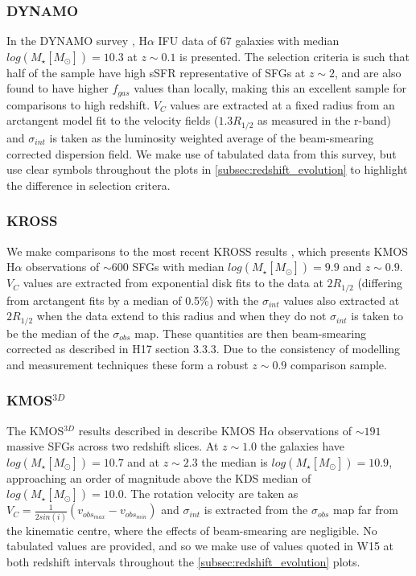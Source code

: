 \documentclass[fleqn,usenatbib]{mn2e}
\begin{document}
\subsubsection{DYNAMO}\label{subsubsec:DYNAMO}
In the DYNAMO survey \citep[G14]{Green2014}, H$\alpha$ IFU data of 67 galaxies with median $log(M_{\star}[M_{\odot}])=10.3$ at $z\sim0.1$ is presented.
The selection criteria is such that half of the sample have high sSFR representative of SFGs at $z\sim 2$, and are also found to have higher $f_{gas}$ values than locally, making this an excellent sample for comparisons to high redshift.
$V_{C}$ values are extracted at a fixed radius from an arctangent model fit to the velocity fields ($1.3R_{1/2}$ as measured in the r-band) and $\sigma_{int}$ is taken as the luminosity weighted average of the beam-smearing corrected dispersion field.
We make use of tabulated data from this survey, but use clear symbols throughout the plots in \cref{subsec:redshift_evolution} to highlight the difference in selection critera.

\subsubsection{KROSS}\label{subsubsec:KROSS}
We make comparisons to the most recent KROSS results \citep[H17]{Harrison2017}, which presents KMOS H$\alpha$ observations of $\sim600$ SFGs with median $log(M_{\star}[M_{\odot}])=9.9$ and $z\sim0.9$.
$V_{C}$ values are extracted from exponential disk fits to the data at $2R_{1/2}$ (differing from arctangent fits by a median of 0.5\%) with the $\sigma_{int}$ values also extracted at $2R_{1/2}$ when the data extend to this radius and when they do not $\sigma_{int}$ is taken to be the median of the $\sigma_{obs}$ map.
These quantities are then beam-smearing corrected as described in H17 section 3.3.3. 
Due to the consistency of modelling and measurement techniques these form a robust $z\sim0.9$ comparison sample.

\subsubsection{KMOS$^{3D}$}\label{subsubsec:kmos_3d}
The KMOS$^{3D}$ results described in \cite[W15]{Wisnioski2015} describe KMOS H$\alpha$ observations of $\sim191$ massive SFGs across two redshift slices. 
At $z \sim 1.0$ the galaxies have $log(M_{\star}[M_{\odot}])=10.7$ and at $z \sim 2.3$ the median is $log(M_{\star}[M_{\odot}])=10.9$, approaching an order of magnitude above the KDS median of $log(M_{\star}[M_{\odot}])=10.0$.   The rotation velocity are taken as $V_{C} = \frac{1}{2sin(i)}(v_{obs_{max}} - v_{obs_{min}})$ and $\sigma_{int}$ is extracted from the $\sigma_{obs}$ map far from the kinematic centre, where the effects of beam-smearing are negligible.
No tabulated values are provided, and so we make use of values quoted in W15 at both redshift intervals throughout the \cref{subsec:redshift_evolution} plots.
\end{document}
